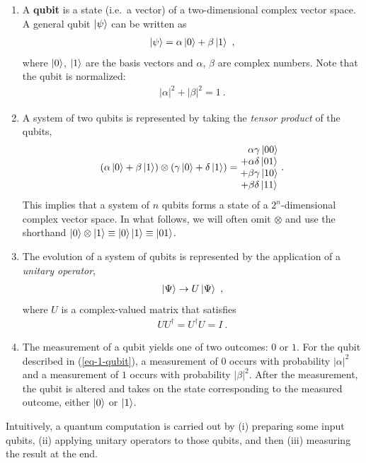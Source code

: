 \documentclass{article}
\numberwithin{equation}{section} 		%
\begin{document}
\begin{enumerate}
	\item A \textbf{qubit} is a state (i.e.~a vector) of a two-dimensional complex vector space. A general qubit $\ket{\psi}$ can be written as
		\begin{align} \label{eq-1-qubit}
			\ket{\psi} = \alpha \ket{0} + \beta \ket{1} ~,
		\end{align}
		where $\ket{0}$, $\ket{1}$ are the basis vectors and $\alpha$, $\beta$ are complex numbers.
		Note that the qubit is normalized:
		\begin{align}
			|\alpha|^2 + |\beta|^2 = 1 ~.
		\end{align}
	\item A system of two qubits is represented by taking the \emph{tensor product} of the qubits,
		\begin{align}
			(\alpha \ket{0} + \beta\ket{1}) \otimes (\gamma \ket{0} + \delta \ket{1}) =
			\mqty{ \phantom{+}\alpha \gamma \ket{0 0} \\ + \alpha \delta \ket{0 1} \\ + \beta \gamma \ket{1 0} \\ + \beta \delta \ket{1 1} } ~.
		\end{align}
		This implies that a system of $n$ qubits forms a state of a $2^n$-dimensional complex vector space.
		In what follows, we will often omit $\otimes$ and use the shorthand $\ket{0} \otimes \ket{1} \equiv \ket{0} \ket{1} \equiv \ket{01}$.
	\item The evolution of a system of qubits is represented by the application of a \emph{unitary operator},
		\begin{align}
			\ket{\Psi} \to U \ket{\Psi} ~,
		\end{align}
		where $U$ is a complex-valued matrix that satisfies
		\begin{align}
			U U^\dagger = U^\dagger U = I ~.
		\end{align}
	\item The measurement of a qubit yields one of two outcomes: $0$ or $1$.
		For the qubit described in (\ref{eq-1-qubit}), a measurement of $0$ occurs with probability $|\alpha|^2$ and a measurement of $1$ occurs with probability $|\beta|^2$.
		After the measurement, the qubit is altered and takes on the state corresponding to the measured outcome, either $\ket{0}$ or $\ket{1}$.
\end{enumerate}

Intuitively, a quantum computation is carried out by (i) preparing some input qubits, (ii) applying unitary operators to those qubits, and then (iii) measuring the result at the end.
\end{document}

